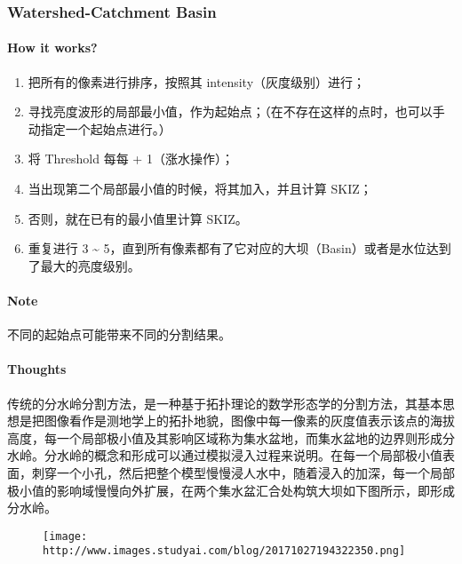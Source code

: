 \documentclass[
]{article}
\begin{document}
\hypertarget{header-n16}{%
\subsubsection{Watershed-Catchment Basin}\label{header-n16}}

\hypertarget{header-n17}{%
\paragraph{How it works?}\label{header-n17}}

\begin{enumerate}
\def\labelenumi{\arabic{enumi}.}
\item
  把所有的像素进行排序，按照其 intensity（灰度级别）进行；
\item
  寻找亮度波形的局部最小值，作为起始点；（在不存在这样的点时，也可以手动指定一个起始点进行。）
\item
  将 Threshold 每每 + 1（涨水操作）；
\item
  当出现第二个局部最小值的时候，将其加入，并且计算 SKIZ；
\item
  否则，就在已有的最小值里计算 SKIZ。
\item
  重复进行 3 \textasciitilde{}
  5，直到所有像素都有了它对应的大坝（Basin）或者是水位达到了最大的亮度级别。
\end{enumerate}

\hypertarget{header-n31}{%
\paragraph{Note}\label{header-n31}}

不同的起始点可能带来不同的分割结果。

\hypertarget{header-n33}{%
\paragraph{Thoughts}\label{header-n33}}

传统的分水岭分割方法，是一种基于拓扑理论的数学形态学的分割方法，其基本思想是把图像看作是测地学上的拓扑地貌，图像中每一像素的灰度值表示该点的海拔高度，每一个局部极小值及其影响区域称为集水盆地，而集水盆地的边界则形成分水岭。分水岭的概念和形成可以通过模拟浸入过程来说明。在每一个局部极小值表面，刺穿一个小孔，然后把整个模型慢慢浸人水中，随着浸入的加深，每一个局部极小值的影响域慢慢向外扩展，在两个集水盆汇合处构筑大坝如下图所示，即形成分水岭。

\begin{figure}
\centering
\texttt{[image: http://www.images.studyai.com/blog/20171027194322350.png]}
\caption{}
\end{figure}
\end{document}

